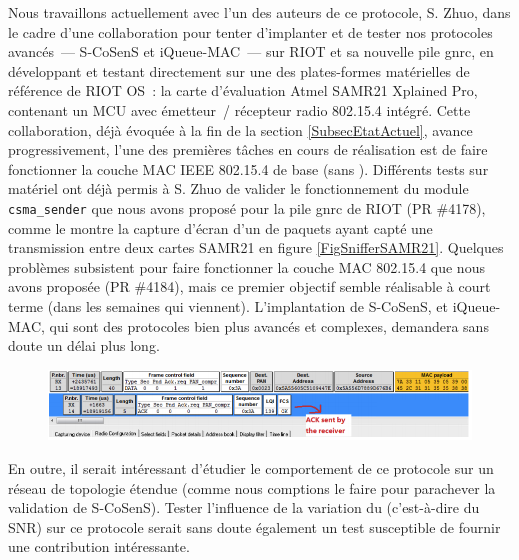 Nous travaillons actuellement avec l'un des auteurs de ce protocole, S. Zhuo,
dans le cadre d'une collaboration pour tenter d'implanter et de tester nos
protocoles avancés~--- S-CoSenS et iQueue-MAC~--- sur RIOT et sa nouvelle
pile gnrc, en développant et testant directement sur une des plates-formes
matérielles de référence de RIOT OS~: la carte d'évaluation Atmel
SAMR21 Xplained Pro, contenant un MCU avec émetteur~/ récepteur radio
802.15.4 intégré. Cette collaboration, déjà évoquée à la fin de la section
\vref{SubsecEtatActuel}, avance progressivement, l'une des premières tâches
en cours de réalisation est de faire fonctionner la couche MAC IEEE 802.15.4
de base (sans ). Différents tests sur matériel ont déjà
permis à S. Zhuo de valider le fonctionnement du module \texttt{csma\_sender}
que nous avons proposé pour la pile gnrc de RIOT (PR \#4178), comme le montre
la capture d'écran d'un  de paquets ayant capté une
transmission entre deux cartes SAMR21 en figure \vref{FigSnifferSAMR21}.
Quelques problèmes subsistent pour faire fonctionner la couche MAC 802.15.4
que nous avons proposée (PR \#4184), mais ce premier objectif semble
 réalisable à court terme (dans les semaines qui viennent).
L'implantation de S-CoSenS, et  iQueue-MAC, qui sont
des protocoles bien plus avancés et complexes, demandera sans doute
un délai plus long.

\begin{figure}[!hbt]
\centering
\includegraphics[width=12cm]{images/ch7-sniffer-SAMR21.png}
\label{FigSnifferSAMR21}
\end{figure}

\medskip

En outre, il serait intéressant d'étudier le comportement de ce protocole
sur un réseau de topologie étendue (comme nous comptions le faire pour
parachever la validation de S-CoSenS). Tester l'influence de la variation
du  (c'est-à-dire du SNR) sur ce protocole serait
sans doute également un test susceptible de fournir une contribution
intéressante.


